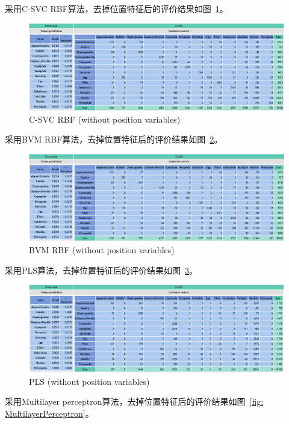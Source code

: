 \documentclass[12pt]{article}
\begin{document}
采用C-SVC RBF算法，去掉位置特征后的评价结果如图~\ref{fig: C-SVC-RBF}。

\begin{figure}[!ht]
\centering
\includegraphics[width=1.0\textwidth]{C-SVC-RBF.png}
\caption{C-SVC RBF (without position variables)}
\label{fig: C-SVC-RBF}
\end{figure} 

采用BVM RBF算法，去掉位置特征后的评价结果如图~\ref{fig: BVM-RBF}。

\begin{figure}[!ht]
\centering
\includegraphics[width=1.0\textwidth]{BVM-RBF.png}
\caption{BVM RBF (without position variables)}
\label{fig: BVM-RBF}
\end{figure} 

采用PLS算法，去掉位置特征后的评价结果如图~\ref{fig: PLS}。

\begin{figure}[!ht]
\centering
\includegraphics[width=1.0\textwidth]{PLS.png}
\caption{PLS (without position variables)}
\label{fig: PLS}
\end{figure} 

采用Multilayer perceptron算法，去掉位置特征后的评价结果如图~\ref{fig: MultilayerPerceptron}。
\end{document}
